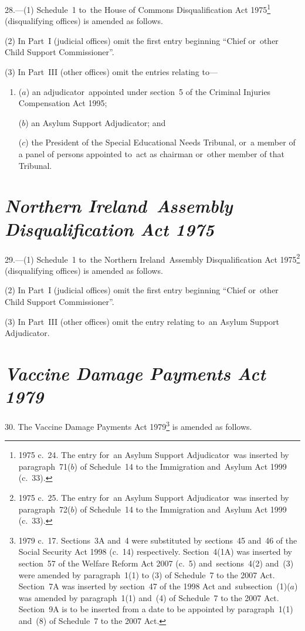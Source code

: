 \documentclass[12pt,a4paper]{article}
\begin{document}
28.---(1)  Schedule~1 to~the House of Commons Disqualification Act 1975\footnote{1975 c.~24. The entry for~an Asylum Support Adjudicator~was inserted by paragraph~71($b$) of Schedule~14 to the Immigration and~Asylum Act 1999 (c.~33).} (disqualifying offices) is amended as follows.

(2) In Part~I (judicial offices) omit the first entry beginning “Chief or~other Child Support Commissioner”.

(3) In Part~III (other offices) omit the entries relating to—
\begin{enumerate}\item[]
($a$) an adjudicator~appointed under section~5 of the Criminal Injuries Compensation Act 1995;

($b$) an Asylum Support Adjudicator; and

($c$) the President of the Special Educational Needs Tribunal, or~a member of a panel of persons appointed to~act as chairman or~other member of that Tribunal.
\end{enumerate}

\section*{\itshape Northern Ireland~Assembly Disqualification Act 1975}

29.---(1)  Schedule~1 to~the Northern Ireland~Assembly Disqualification Act 1975\footnote{1975 c.~25. The entry for~an Asylum Support Adjudicator~was inserted by paragraph~72($b$) of Schedule~14 to the Immigration and~Asylum Act 1999 (c.~33).} (disqualifying offices) is amended as follows.

(2) In Part~I (judicial offices) omit the first entry beginning “Chief or~other Child Support Commissioner”.

(3) In Part~III (other offices) omit the entry relating to~an Asylum Support Adjudicator.

\section*{\itshape Vaccine Damage Payments Act 1979}

30.  The Vaccine Damage Payments Act 1979\footnote{1979 c.~17. Sections~3A and~4 were substituted by sections~45 and~46 of the Social Security Act 1998 (c.~14) respectively. Section~4(1A) was inserted by section~57 of the Welfare Reform Act 2007 (c.~5) and~sections~4(2) and~(3) were amended by paragraph~1(1) to (3) of Schedule~7 to the 2007 Act. Section~7A was inserted by section~47 of the 1998 Act and~subsection~(1)($a$) was amended by paragraph~1(1) and~(4) of Schedule~7 to the 2007 Act. Section~9A is to be inserted from a date to be appointed by paragraph~1(1) and~(8) of Schedule~7 to the 2007 Act.} is amended as follows.
\end{document}
